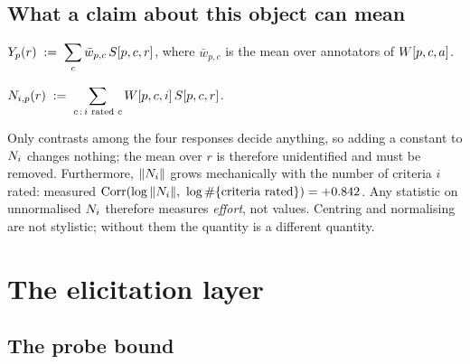 \subsection{What a claim about this object can mean}

\begin{definition}
\label{def:score}
$\displaystyle Y_p(r) \;:=\; \sum_{c} \bar w_{p,c}\,S[p,c,r]$, where
$\bar w_{p,c}$ is the mean over annotators of $W[p,c,a]$.
\end{definition}

\begin{definition}
\label{def:ni}
$\displaystyle N_{i,p}(r) \;:=\; \sum_{c \,:\, i \text{ rated } c} W[p,c,i]\,S[p,c,r]$.
\end{definition}

\begin{remark}
\label{rem:normalise}
Only contrasts among the four responses decide anything, so adding a constant to
$N_i$ changes nothing; the mean over $r$ is therefore unidentified and must be
removed. Furthermore, $\|N_i\|$ grows mechanically with the number of criteria
$i$ rated: measured
$\operatorname{Corr}(\log\|N_i\|,\ \log \#\{\text{criteria rated}\}) = +0.842$. Any statistic
on unnormalised $N_i$ therefore measures \emph{effort}, not values. Centring and
normalising are not stylistic; without them the quantity is a different quantity.
\end{remark}

\section{The elicitation layer}
\label{sec:elicit}

\subsection{The probe bound}


